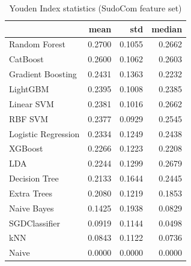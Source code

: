 \begin{table}
\caption{Youden Index statistics (SudoCom feature set)}
\label{tab:youden_SudoCom_stats}
\begin{tabular}{lrrr}
\toprule
 & mean & std & median \\
\midrule
Random Forest & 0.2700 & 0.1055 & 0.2662 \\
CatBoost & 0.2600 & 0.1062 & 0.2603 \\
Gradient Boosting & 0.2431 & 0.1363 & 0.2232 \\
LightGBM & 0.2395 & 0.1008 & 0.2385 \\
Linear SVM & 0.2381 & 0.1016 & 0.2662 \\
RBF SVM & 0.2377 & 0.0929 & 0.2545 \\
Logistic Regression & 0.2334 & 0.1249 & 0.2438 \\
XGBoost & 0.2266 & 0.1223 & 0.2208 \\
LDA & 0.2244 & 0.1299 & 0.2679 \\
Decision Tree & 0.2133 & 0.1644 & 0.2445 \\
Extra Trees & 0.2080 & 0.1219 & 0.1853 \\
Naive Bayes & 0.1425 & 0.1938 & 0.0829 \\
SGDClassifier & 0.0919 & 0.1144 & 0.0498 \\
kNN & 0.0843 & 0.1122 & 0.0736 \\
Naive & 0.0000 & 0.0000 & 0.0000 \\
\bottomrule
\end{tabular}
\end{table}
